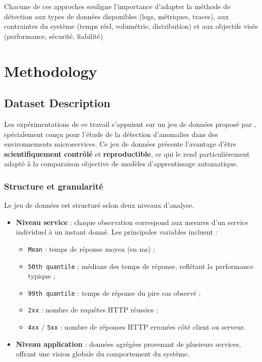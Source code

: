 \documentclass[conference]{IEEEtran}
\begin{document}
Chacune de ces approches souligne l’importance d’adapter la méthode de détection aux types de données disponibles (logs, métriques, traces), aux contraintes du système (temps réel, volumétrie, distribution) et aux objectifs visés (performance, sécurité, fiabilité).

\section{Methodology}
\subsection{Dataset Description}

Les expérimentations de ce travail s'appuient sur un jeu de données proposé par \cite{nobre2023}, spécialement conçu pour l’étude de la détection d’anomalies dans des environnements microservices. Ce jeu de données présente l’avantage d’être \textbf{scientifiquement contrôlé} et \textbf{reproductible}, ce qui le rend particulièrement adapté à la comparaison objective de modèles d’apprentissage automatique.

\subsubsection{Structure et granularité}
Le jeu de données est structuré selon deux niveaux d’analyse.
\begin{itemize}
    \item \textbf{Niveau service} : chaque observation correspond aux mesures d’un service individuel à un instant donné. Les principales variables incluent :
    \begin{itemize}
        \item \texttt{Mean} : temps de réponse moyen (en ms) ;
        \item \texttt{50th quantile} : médiane des temps de réponse, reflétant la performance typique ;
        \item \texttt{99th quantile} : temps de réponse du pire cas observé ;
        \item \texttt{2xx} : nombre de requêtes HTTP réussies ;
        \item \texttt{4xx} / \texttt{5xx} : nombre de réponses HTTP erronées côté client ou serveur.
    \end{itemize}
    \item \textbf{Niveau application} : données agrégées provenant de plusieurs services, offrant une vision globale du comportement du système.
\end{itemize}
\end{document}
